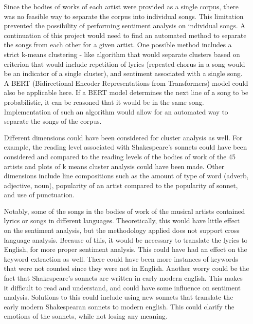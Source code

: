\documentclass[10pt,a4paper]{article}
\begin{document}
\noindent Since the bodies of works of each artist were provided as a single corpus, there was no feasible way to separate the corpus into individual songs. This limitation prevented the possibility of performing sentiment analysis on individual songs. A continuation of this project would need to find an automated method to separate the songs from each other for a given artist. One possible method includes a strict k-means clustering - like algorithm that would separate clusters based on criterion that would include repetition of lyrics (repeated chorus in a song would be an indicator of a single cluster), and sentiment associated with a single song. A BERT (Bidirectional Encoder Representations from Transformers) model could also be applicable here. If a BERT model determines the next line of a song to be probabilistic, it can be reasoned that it would be in the same song. Implementation of such an algorithm would allow for an automated way to separate the songs of the corpus.

\noindent Different dimensions could have been considered for cluster analysis as well. For example, the reading level associated with Shakespeare’s sonnets could have been considered and compared to the reading levels of the bodies of work of the 45 artists and plots of k means cluster analysis could have been made. Other dimensions include line compositions such as the amount of type of word (adverb, adjective, noun), popularity of an artist compared to the popularity of sonnet, and use of punctuation. 

\noindent Notably, some of the songs in the bodies of work of the musical artists contained lyrics or songs in different languages. Theoretically, this would have little effect on the sentiment analysis, but the methodology applied does not support cross language analysis. Because of this, it would be necessary to translate the lyrics to English, for more proper sentiment analysis. This could have had an effect on the keyword extraction as well. There could have been more instances of keywords that were not counted since they were not in English. Another worry could be the fact that Shakespeare’s sonnets are written in early modern english. This makes it difficult to read and understand, and could have some influence on sentiment analysis. Solutions to this could include using new sonnets that translate the early modern Shakespearan sonnets to modern english. This could clarify the emotions of the sonnets, while not losing any meaning. 
\end{document}
